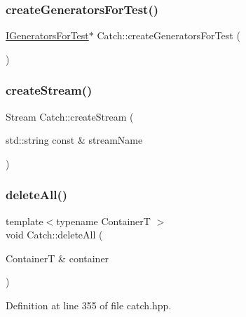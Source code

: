 \hypertarget{namespace_catch_a3d93b31e88fd01ee9e0d20757ff64eab}{}\label{namespace_catch_a3d93b31e88fd01ee9e0d20757ff64eab} 
\subsubsection{\texorpdfstring{create\+Generators\+For\+Test()}{createGeneratorsForTest()}}
{\footnotesize\ttfamily \hyperlink{struct_catch_1_1_i_generators_for_test}{I\+Generators\+For\+Test}$\ast$ Catch\+::create\+Generators\+For\+Test (\begin{DoxyParamCaption}{ }\end{DoxyParamCaption})}

\hypertarget{namespace_catch_ad7591011c5d99d59504ecd3384001c3e}{}\label{namespace_catch_ad7591011c5d99d59504ecd3384001c3e} 
\subsubsection{\texorpdfstring{create\+Stream()}{createStream()}}
{\footnotesize\ttfamily Stream Catch\+::create\+Stream (\begin{DoxyParamCaption}\item[{std\+::string const \&}]{stream\+Name }\end{DoxyParamCaption})}

\hypertarget{namespace_catch_aadf9786550a462740ec355f8219863a9}{}\label{namespace_catch_aadf9786550a462740ec355f8219863a9} 
\subsubsection{\texorpdfstring{delete\+All()}{deleteAll()}}
{\footnotesize\ttfamily template$<$typename ContainerT $>$ \\
void Catch\+::delete\+All (\begin{DoxyParamCaption}\item[{ContainerT \&}]{container }\end{DoxyParamCaption})\hspace{0.3cm}{\ttfamily [inline]}}



Definition at line 355 of file catch.\+hpp.

